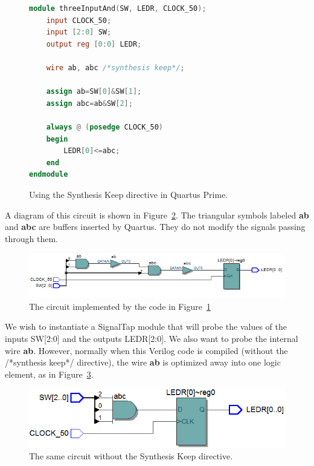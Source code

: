 \documentclass[11pt, twoside, pdftex]{article}
\begin{document}

\begin{figure}[H]
\begin{lstlisting}[language=Verilog, xleftmargin=.3\textwidth]
module threeInputAnd(SW, LEDR, CLOCK_50);
	input CLOCK_50;
	input [2:0] SW;
	output reg [0:0] LEDR;

	wire ab, abc /*synthesis keep*/;

	assign ab=SW[0]&SW[1];
	assign abc=ab&SW[2];
	
	always @ (posedge CLOCK_50)
	begin
		LEDR[0]<=abc;
	end
endmodule

\end{lstlisting}
     \caption{Using the Synthesis Keep directive in Quartus Prime.}
	 \label{fig:25}
\end{figure}
 
A diagram of this circuit is shown in Figure~\ref{fig:26}. The triangular symbols labeled
{\bf ab} and {\bf abc} are buffers inserted by Quartus. They do not modify the
signals passing through them.

\begin{figure}[H]
   \begin{center}
      \includegraphics[scale=0.65]{figures/figure26.png}
   \caption{The circuit implemented by the code in Figure~\ref{fig:25}} 
	 \label{fig:26}
	 \end{center}
\end{figure}

We wish to instantiate a SignalTap module that will probe the values of the inputs SW[2:0] and the outputs LEDR[2:0]. We also want to
probe the internal wire {\bf ab}. However, normally when this Verilog code is compiled (without the /*synthesis keep*/ directive), the wire {\bf ab} is optimized away into one logic element, as in Figure~\ref{fig:27}.

\begin{figure}[H]
   \begin{center}
      \includegraphics[scale=0.65]{figures/figure27.png}
   \caption{The same circuit without the Synthesis Keep directive.} 
	 \label{fig:27}
	 \end{center}
\end{figure}
\end{document}

